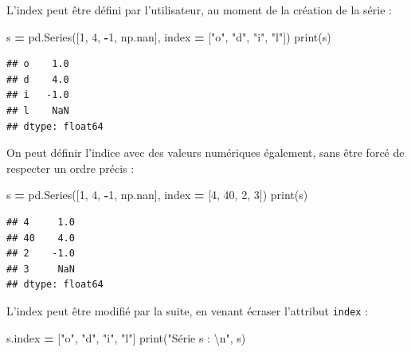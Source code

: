 \documentclass[12pt,]{book}
\newenvironment{Shaded}{\begin{snugshade}}{\end{snugshade}}
\newcommand{\DecValTok}[1]{\textcolor[rgb]{0.00,0.00,0.81}{#1}}
\newcommand{\CharTok}[1]{\textcolor[rgb]{0.31,0.60,0.02}{#1}}
\newcommand{\StringTok}[1]{\textcolor[rgb]{0.31,0.60,0.02}{#1}}
\newcommand{\OperatorTok}[1]{\textcolor[rgb]{0.81,0.36,0.00}{\textbf{#1}}}
\newcommand{\BuiltInTok}[1]{#1}
\newcommand{\NormalTok}[1]{#1}
\numberwithin{equation}{section}
\numberwithin{countremarque}{section}
\begin{document}
L'index peut être défini par l'utilisateur, au moment de la création de
la série :

\begin{Shaded}
\begin{Highlighting}[]
\NormalTok{s }\OperatorTok{=}\NormalTok{ pd.Series([}\DecValTok{1}\NormalTok{, }\DecValTok{4}\NormalTok{, }\OperatorTok{-}\DecValTok{1}\NormalTok{, np.nan],}
\NormalTok{             index }\OperatorTok{=}\NormalTok{ [}\StringTok{"o"}\NormalTok{, }\StringTok{"d"}\NormalTok{, }\StringTok{"i"}\NormalTok{, }\StringTok{"l"}\NormalTok{])}
\BuiltInTok{print}\NormalTok{(s)}
\end{Highlighting}
\end{Shaded}

\begin{lstlisting}
## o    1.0
## d    4.0
## i   -1.0
## l    NaN
## dtype: float64
\end{lstlisting}

On peut définir l'indice avec des valeurs numériques également, sans
être forcé de respecter un ordre précis :

\begin{Shaded}
\begin{Highlighting}[]
\NormalTok{s }\OperatorTok{=}\NormalTok{ pd.Series([}\DecValTok{1}\NormalTok{, }\DecValTok{4}\NormalTok{, }\OperatorTok{-}\DecValTok{1}\NormalTok{, np.nan],}
\NormalTok{             index }\OperatorTok{=}\NormalTok{ [}\DecValTok{4}\NormalTok{, }\DecValTok{40}\NormalTok{, }\DecValTok{2}\NormalTok{, }\DecValTok{3}\NormalTok{])}
\BuiltInTok{print}\NormalTok{(s)}
\end{Highlighting}
\end{Shaded}

\begin{lstlisting}
## 4     1.0
## 40    4.0
## 2    -1.0
## 3     NaN
## dtype: float64
\end{lstlisting}

L'index peut être modifié par la suite, en venant écraser l'attribut
\texttt{index} :

\begin{Shaded}
\begin{Highlighting}[]
\NormalTok{s.index }\OperatorTok{=}\NormalTok{ [}\StringTok{"o"}\NormalTok{, }\StringTok{"d"}\NormalTok{, }\StringTok{"i"}\NormalTok{, }\StringTok{"l"}\NormalTok{]}
\BuiltInTok{print}\NormalTok{(}\StringTok{"Série s : }\CharTok{\textbackslash{}n}\StringTok{"}\NormalTok{, s)}
\end{Highlighting}
\end{Shaded}
\end{document}
